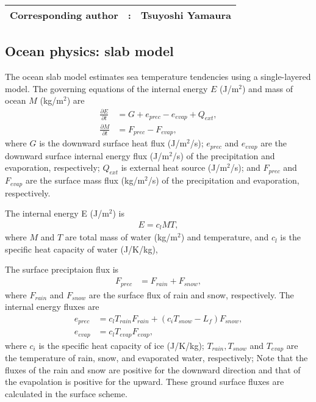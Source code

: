 {\bf \Large 
\begin{tabular}{ccc}
\hline
  Corresponding author & : & Tsuyoshi Yamaura\\
\hline
\end{tabular}
}


\subsection{Ocean physics: slab model}

The ocean slab model estimates sea temperature tendencies using a single-layered model.
The governing equations of the internal energy $E$ (J/m$^2$) and mass of ocean $M$ (kg/m$^2$) are
\begin{align}
  \frac{\partial E}{\partial t} &= G + e_{prec} - e_{evap} + Q_{ext}, \label{eq:Ocean-Tdt} \\
  \frac{\partial M}{\partial t} &= F_{prec} - F_{evap},
\end{align}
where
$G$ is the downward surface heat flux (J/m$^2$/s);
$e_{prec}$ and $e_{evap}$ are the downward surface internal energy flux (J/m$^2$/s) of the precipitation and evaporation, respectively;
$Q_{ext}$ is external heat source (J/m$^2$/s);
and $F_{prec}$ and $F_{evap}$ are the surface mass flux (kg/m$^2$/s) of the precipitation and evaporation, respectively.

The internal energy E (J/m$^2$) is
\begin{align}
 E = c_l M T,
\end{align}
where $M$ and $T$ are total mass of water (kg/m$^2$) and temperature, and
$c_l$ is the specific heat capacity of water (J/K/kg),


The surface preciptaion flux is
\begin{align}
 F_{prec} &= F_{rain} + F_{snow},
\end{align}
where $F_{rain}$ and $F_{snow}$ are the surface flux of rain and snow, respectively.
The internal energy fluxes are
\begin{align}
 e_{prec} &= c_lT_{rain}F_{rain} + ( c_iT_{snow} - L_f ) F_{snow}, \\
 e_{evap} &= c_lT_{evap}F_{evap},
\end{align}
where $c_i$ is the specific heat capacity of ice (J/K/kg);
$T_{rain}, T_{snow}$ and $T_{evap}$ are the temperature of rain, snow, and evaporated water, respectively;
Note that the fluxes of the rain and snow are positive for the downward direction and that of the evapolation is positive for the upward.
These ground surface fluxes are calculated in the surface scheme.


